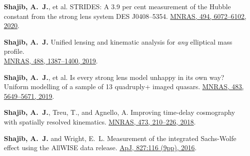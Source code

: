 \documentclass[margin, line]{res}
\begin{document}
\begin{resume}
\begin{etaremune}
	\item \textbf{Shajib, A.~J.}, et al. STRIDES: A 3.9 per cent measurement of the Hubble constant from the strong lens system DES J0408--5354. \href{https://academic.oup.com/mnras/advance-article-abstract/doi/10.1093/mnras/staa828/5813265}{MNRAS, 494, 6072--6102, 2020}.
	\item \textbf{Shajib, A.~J.} Unified lensing and kinematic analysis for \textit{any} elliptical mass profile. \\ \href{https://doi.org/10.1093/mnras/stz1796}{MNRAS, 488, 1387--1400, 2019}.
	\item \textbf{Shajib, A.~J.}, et al. Is every strong lens model unhappy in its own way? Uniform modelling of a sample of 13 quadruply+ imaged quasars. \href{https://doi.org/10.1093/mnras/sty3397}{MNRAS, 483, 5649--5671, 2019}.
	\item \textbf{Shajib, A.~J.}, Treu, T., and Agnello, A. Improving time-delay cosmography with spatially resolved kinematics. \href{https://doi.org/10.1093/mnras/stx2302}{MNRAS, 473, 210--226, 2018}.
	\item \textbf{Shajib, A.~J.} and Wright, E.~L. Measurement of the integrated Sachs-Wolfe effect using the AllWISE data release. \href{http://dx.doi.org/10.3847/0004-637X/827/2/116}{ApJ, 827:116 (9pp), 2016}.
\end{etaremune}



\end{resume}
\end{document}
